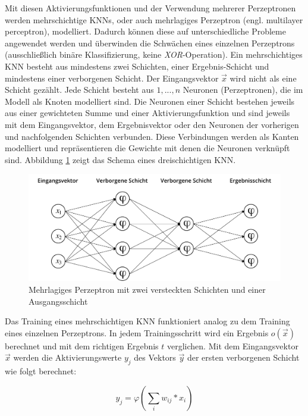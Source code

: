 Mit diesen Aktivierungsfunktionen und der Verwendung mehrerer Perzeptronen werden mehrschichtige \acp{KNN}, oder auch mehrlagiges Perzeptron (engl. multilayer perceptron), modelliert. Dadurch können diese auf unterschiedliche Probleme angewendet werden und überwinden die Schwächen eines einzelnen Perzeptrons (ausschließlich binäre Klassifizierung, keine \textit{XOR}-Operation). Ein mehrschichtiges \ac{KNN} besteht aus mindestens zwei Schichten, einer Ergebnis-Schicht und mindestens einer verborgenen Schicht. Der Eingangsvektor $\vec{x}$ wird nicht als eine Schicht gezählt. Jede Schicht besteht aus $1, ..., n$ Neuronen (Perzeptronen), die im Modell als Knoten modelliert sind. Die Neuronen einer Schicht bestehen jeweils aus einer gewichteten Summe und einer Aktivierungsfunktion und sind jeweils mit dem Eingangsvektor, dem Ergebnisvektor oder den Neuronen der vorherigen und nachfolgenden Schichten verbunden. Diese Verbindungen werden als Kanten modelliert und repräsentieren die Gewichte mit denen die Neuronen verknüpft sind. Abbildung \ref{fig_knn} zeigt das Schema eines dreischichtigen \ac{KNN}.

\begin{figure}[h]
\centering
\includegraphics[scale=0.7]{images/knn.pdf}
\caption{Mehrlagiges Perzeptron mit zwei versteckten Schichten und einer Ausgangsschicht}
\label{fig_knn}
\end{figure}

Das Training eines mehrschichtigen \ac{KNN} funktioniert analog zu dem Training eines einzelnen Perzeptrons. In jedem Trainingsschritt wird ein Ergebnis $o(\vec{x})$ berechnet und mit dem richtigen Ergebnis $t$ verglichen. Mit dem Eingangsvektor $\vec{x}$ werden die Aktivierungswerte $y_j$ des Vektors  $\vec{y}$ der ersten verborgenen Schicht wie folgt berechnet:

\begin{equation}
y_j = \varphi(\sum_i{w_{ij}*x_i})
\end{equation}

